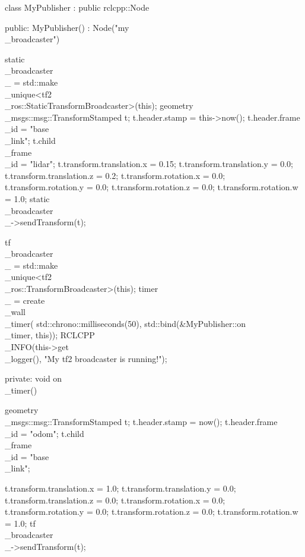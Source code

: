 \documentclass[a4paper,12pt]{book}
\begin{document}
{class MyPublisher : public rclcpp::Node {
public:
    MyPublisher()
    : Node("my\\_broadcaster")
    {
        static\\_broadcaster\\_ = std::make\\_unique<tf2\\_ros::StaticTransformBroadcaster>(this);
        geometry\\_msgs::msg::TransformStamped t;
        t.header.stamp = this->now();
        t.header.frame\\_id = "base\\_link";
        t.child\\_frame\\_id = "lidar";
        t.transform.translation.x = 0.15;
        t.transform.translation.y = 0.0;
        t.transform.translation.z = 0.2;
        t.transform.rotation.x = 0.0;
        t.transform.rotation.y = 0.0;
        t.transform.rotation.z = 0.0;
        t.transform.rotation.w = 1.0;
        static\\_broadcaster\\_->sendTransform(t);

        tf\\_broadcaster\\_ = std::make\\_unique<tf2\\_ros::TransformBroadcaster>(this);
        timer\\_ = create\\_wall\\_timer(
        std::chrono::milliseconds(50),
        std::bind(\&MyPublisher::on\\_timer, this));
        RCLCPP\\_INFO(this->get\\_logger(), "My tf2 broadcaster is running!");
    }


private:
    void on\\_timer() {
    geometry\\_msgs::msg::TransformStamped t;
        t.header.stamp = now();
        t.header.frame\\_id = "odom";
        t.child\\_frame\\_id = "base\\_link";

        t.transform.translation.x = 1.0;
        t.transform.translation.y = 0.0;
        t.transform.translation.z = 0.0;
        t.transform.rotation.x = 0.0;
        t.transform.rotation.y = 0.0;
        t.transform.rotation.z = 0.0;
        t.transform.rotation.w = 1.0;
        tf\\_broadcaster\\_->sendTransform(t);
    }


}}
\end{document}
